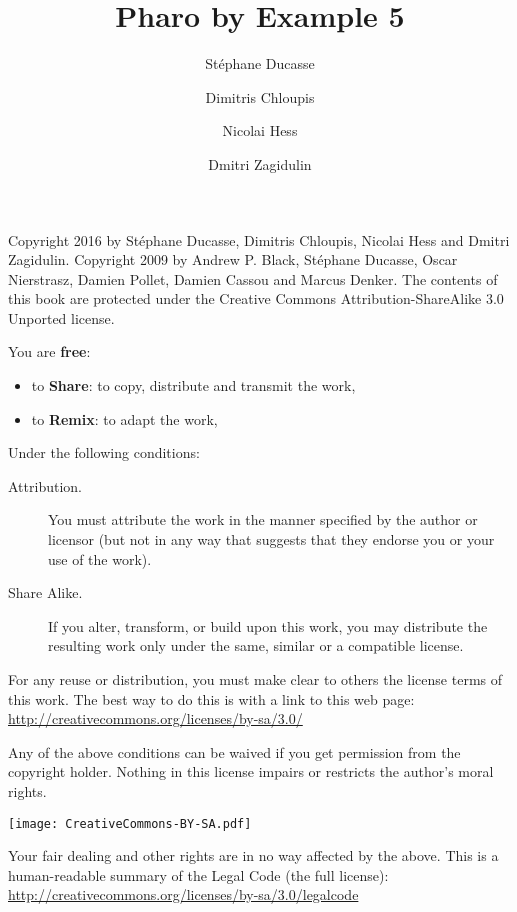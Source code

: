 \documentclass[10pt,twoside,english,showtrims]{support/latex/sbabook/sbabook}
\title{Pharo by Example 5}
\author{
    St\'ephane Ducasse \and
    Dimitris Chloupis \and Nicolai Hess \and Dmitri Zagidulin}
\date{\gitdate\titlebreak[\smallskip]{ -- }\protect\gitCommitInfo}
\begin{document}
\maketitle
\pagestyle{titlingpage}
\thispagestyle{titlingpage} %

\cleartoverso
{\small

  Copyright 2016 by St\'ephane Ducasse, Dimitris Chloupis, Nicolai Hess and Dmitri Zagidulin.
  Copyright 2009 by Andrew P. Black, Stéphane Ducasse, Oscar Nierstrasz, Damien Pollet, Damien Cassou and Marcus Denker.
  The contents of this book are protected under the Creative Commons
  Attribution-ShareAlike 3.0 Unported license.

  You are \textbf{free}:
  \begin{itemize}
  \item to \textbf{Share}: to copy, distribute and transmit the work,
  \item to \textbf{Remix}: to adapt the work,
  \end{itemize}

  Under the following conditions:
  \begin{description}
  \item[Attribution.] You must attribute the work in the manner specified by the
    author or licensor (but not in any way that suggests that they endorse you
    or your use of the work).
  \item[Share Alike.] If you alter, transform, or build upon this work, you may
    distribute the resulting work only under the same, similar or a compatible
    license.
  \end{description}

  For any reuse or distribution, you must make clear to others the
  license terms of this work. The best way to do this is with a link to
  this web page: \\
  \url{http://creativecommons.org/licenses/by-sa/3.0/}

  Any of the above conditions can be waived if you get permission from
  the copyright holder. Nothing in this license impairs or restricts the
  author's moral rights.

  \begin{center}
    \texttt{[image: CreativeCommons-BY-SA.pdf]}
  \end{center}

  Your fair dealing and other rights are in no way affected by the
  above. This is a human-readable summary of the Legal Code (the full
  license): \\
  \url{http://creativecommons.org/licenses/by-sa/3.0/legalcode}

}
\end{document}
